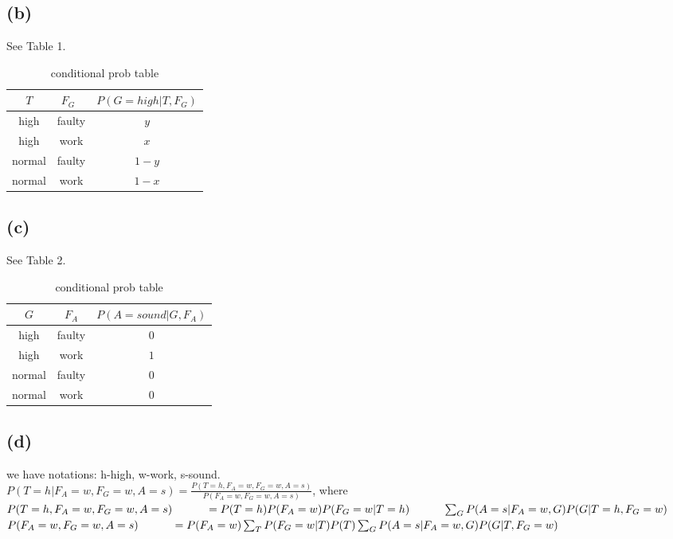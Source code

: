 \documentclass[12pt]{amsart}
\begin{document}
\subsection*{(b)}
See Table 1.
\begin{table}[h]
\centering
\caption{conditional prob table}
    \begin{tabular}{| c c | c |}
      \hline
      $T$  & $F_G$  & $P(G=high|T,F_G)$ \\ \hline
      high & faulty & $y$\\
      high & work   & $x$\\
      normal & faulty & $1-y$\\
      normal & work   & $1-x$\\
        \hline
      \end{tabular}
\end{table}


\subsection*{(c)}
See Table 2.
\begin{table}[h]
\centering
\caption{conditional prob table}
    \begin{tabular}{| c c | c |}
      \hline
      $G$  & $F_A$  & $P(A=sound|G,F_A)$ \\ \hline
      high & faulty & $0$\\
      high & work   & $1$\\
      normal & faulty & $0$\\
      normal & work   & $0$\\
        \hline
      \end{tabular}
\end{table}

\subsection*{(d)}
we have notations: h-high, w-work, s-sound.\\
$P(T=h|F_A=w,F_G=w,A=s)=\frac{P(T=h,F_A=w,F_G=w,A=s)}{P(F_A=w,F_G=w,A=s)}$, where\\
$P(T=h,F_A=w,F_G=w,A=s)\\
\indent \indent = P(T=h)P(F_A=w)P(F_G=w|T=h)\\
\indent \indent \sum_{G}P(A=s|F_A=w,G)P(G|T=h,F_G=w)$\\
$P(F_A=w,F_G=w,A=s)\\
\indent \indent = P(F_A=w)\sum_{T}P(F_G=w|T)P(T)\sum_{G}P(A=s|F_A=w,G)P(G|T,F_G=w)$\\
\end{document}
